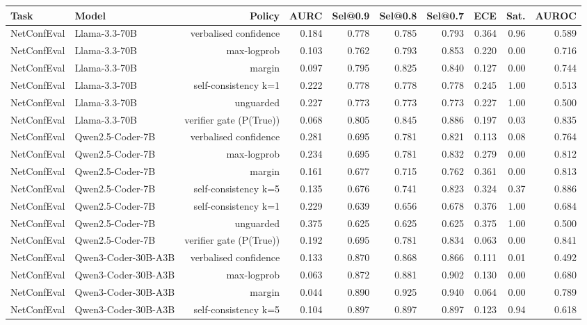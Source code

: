 \begin{tabular}{llrrrrrrrr}
\toprule
Task & Model & Policy & AURC & Sel@0.9 & Sel@0.8 & Sel@0.7 & ECE & Sat. & AUROC \\
\midrule
NetConfEval & Llama-3.3-70B & verbalised confidence & 0.184 & 0.778 & 0.785 & 0.793 & 0.364 & 0.96 & 0.589 \\
NetConfEval & Llama-3.3-70B & max-logprob & 0.103 & 0.762 & 0.793 & 0.853 & 0.220 & 0.00 & 0.716 \\
NetConfEval & Llama-3.3-70B & margin & 0.097 & 0.795 & 0.825 & 0.840 & 0.127 & 0.00 & 0.744 \\
NetConfEval & Llama-3.3-70B & self-consistency k=1 & 0.222 & 0.778 & 0.778 & 0.778 & 0.245 & 1.00 & 0.513 \\
NetConfEval & Llama-3.3-70B & unguarded & 0.227 & 0.773 & 0.773 & 0.773 & 0.227 & 1.00 & 0.500 \\
NetConfEval & Llama-3.3-70B & verifier gate (P(True)) & 0.068 & 0.805 & 0.845 & 0.886 & 0.197 & 0.03 & 0.835 \\
NetConfEval & Qwen2.5-Coder-7B & verbalised confidence & 0.281 & 0.695 & 0.781 & 0.821 & 0.113 & 0.08 & 0.764 \\
NetConfEval & Qwen2.5-Coder-7B & max-logprob & 0.234 & 0.695 & 0.781 & 0.832 & 0.279 & 0.00 & 0.812 \\
NetConfEval & Qwen2.5-Coder-7B & margin & 0.161 & 0.677 & 0.715 & 0.762 & 0.361 & 0.00 & 0.813 \\
NetConfEval & Qwen2.5-Coder-7B & self-consistency k=5 & 0.135 & 0.676 & 0.741 & 0.823 & 0.324 & 0.37 & 0.886 \\
NetConfEval & Qwen2.5-Coder-7B & self-consistency k=1 & 0.229 & 0.639 & 0.656 & 0.678 & 0.376 & 1.00 & 0.684 \\
NetConfEval & Qwen2.5-Coder-7B & unguarded & 0.375 & 0.625 & 0.625 & 0.625 & 0.375 & 1.00 & 0.500 \\
NetConfEval & Qwen2.5-Coder-7B & verifier gate (P(True)) & 0.192 & 0.695 & 0.781 & 0.834 & 0.063 & 0.00 & 0.841 \\
NetConfEval & Qwen3-Coder-30B-A3B & verbalised confidence & 0.133 & 0.870 & 0.868 & 0.866 & 0.111 & 0.01 & 0.492 \\
NetConfEval & Qwen3-Coder-30B-A3B & max-logprob & 0.063 & 0.872 & 0.881 & 0.902 & 0.130 & 0.00 & 0.680 \\
NetConfEval & Qwen3-Coder-30B-A3B & margin & 0.044 & 0.890 & 0.925 & 0.940 & 0.064 & 0.00 & 0.789 \\
NetConfEval & Qwen3-Coder-30B-A3B & self-consistency k=5 & 0.104 & 0.897 & 0.897 & 0.897 & 0.123 & 0.94 & 0.618 \\

\end{tabular}
